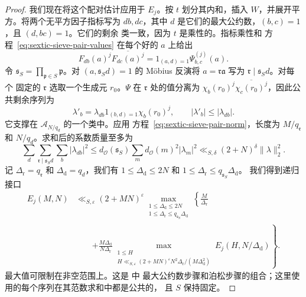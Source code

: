 \documentclass[11pt,a4paper]{article}
\numberwithin{equation}{section}
\numberwithin{figure}{section}
\theoremstyle{definition}
\theoremstyle{remark}
\begin{document}
\begin{proof}
我们现在将这个配对估计应用于 $E_j$。按
$t$ 划分其内和，插入 $W$，并展开平方。将两个无平方因子指标写为
$db,dc$，其中 $d$ 是它们的最大公约数，$(b,c)=1$，且 $(d,bc)=1$。它们的剩余
类一致，因为 $t$ 是乘性的。指标乘性和
方程~\eqref{eq:sextic-sieve-pair-values} 在每个好的 $a$ 上给出
\[
 F_{db}(a)^j\overline{F_{dc}(a)^j}
   =1_{(a,d)=1}\Psi_{b,c}^{(j)}(a).
\]
令 $\mathfrak s_S=\prod_{\mathfrak p\in S}\mathfrak p$。对
$(a,\mathfrak s_Sd)=1$ 的 M\"obius 反演将 $a=\mathfrak r\mathfrak a$ 写为
$\mathfrak r\mid\mathfrak s_Sd$。对每个
固定的 $\mathfrak r$ 选取一个生成元 $r_0$。$\Psi$ 在 $\mathfrak r$ 处的值分离为
$\chi_b(r_0)^j\overline{\chi_c(r_0)^j}$，因此公共剩余序列为
\[
 \lambda'_b=\lambda_{db}1_{(b,d)=1}\chi_b(r_0)^j,
 \qquad |\lambda'_b|\le|\lambda_{db}|.
\]
它支撑在 $\mathcal A_{N/q_d}$ 的一个类中。应用
方程~\eqref{eq:sextic-sieve-pair-norm}，长度为 $M/q_{\mathfrak r}$
和 $N/q_d$。求和后的系数质量至多为
\[
 \sum_d\sum_{\mathfrak r\mid\mathfrak s_Sd}\sum_b|\lambda_{db}|^2
 \le d_{\mathcal O}(\mathfrak s_S)
       \sum_m d_{\mathcal O}(m)^2|\lambda_m|^2
 \ll_{S,\delta}(2+N)^\delta\|\lambda\|_2^2.
\]
记 $\Delta_{\mathrm r}=q_{\mathfrak r}$ 和 $\Delta_{\mathrm d}=q_d$，我们有
$1\le\Delta_{\mathrm d}\le2N$ 和 $1\le\Delta_{\mathrm r}\le q_{\mathfrak s_S}\Delta_{\mathrm d}$。
我们得到递归接口
\begin{equation}\label{eq:sextic-sieve-norm-reflection}
 \begin{split}
 E_j(M,N)
 &\ll_{S,\varepsilon}(2+MN)^\varepsilon
 \max_{\substack{1\le\Delta_{\mathrm d}\le2N\\
                 1\le\Delta_{\mathrm r}\le q_{\mathfrak s_S}\Delta_{\mathrm d}}}
 \left\{\frac M{\Delta_{\mathrm r}}\right.\\
 &\qquad\left.+
 \frac{M\Delta_{\mathrm d}}{N\Delta_{\mathrm r}}
 \max_{\substack{1\le H\\
       H\ll_{S,\varepsilon}(2+MN)^\varepsilon
              N^2\Delta_{\mathrm r}/(M\Delta_{\mathrm d}^2)}}
       E_j(H,N/\Delta_{\mathrm d})\right\}.
 \end{split}
\end{equation}
最大值可限制在非空范围上。这是 \cite[Lemmas~3.2--3.3]{BGL} 中
最大公约数步骤和泊松步骤的组合；这里使用的每个序列在其范数求和中都是公共的，
且 $S$ 保持固定。


\end{proof}
\end{document}
